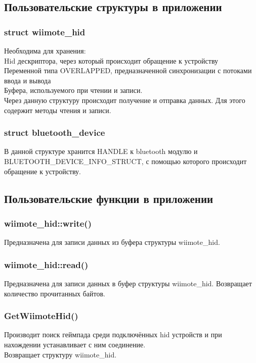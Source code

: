 \subsection{Пользовательские структуры в приложении}
\subsubsection{struct wiimote\_hid}
\quad Необходима для хранения:\\
\quad Hid дескриптора, через который происходит обращение к устройству\\
\quad Переменной типа OVERLAPPED, предназначенной синхронизации с потоками ввода и вывода\\
\quad Буфера, используемого при чтении и записи.\\
Через данную структуру происходит получение и отправка данных.
Для этого содержит методы чтения и записи.

\subsubsection{struct bluetooth\_device}
\quad В данной структуре хранится HANDLE к bluetooth модулю и BLUETOOTH\_DEVICE\_INFO\_STRUCT, с помощью которого происходит обращение к устройству.


\subsection{Пользовательские функции в приложении}
\subsubsection{wiimote\_hid::write()}
\quad Предназначена для записи данных из буфера структуры wiimote\_hid.

\subsubsection{wiimote\_hid::read()}
\quad Предназначена для записи данных в буфер структуры wiimote\_hid.
Возвращает количество прочитанных байтов.

\subsubsection{GetWiimoteHid()}
\quad Производит поиск геймпада среди подключённых hid устройств и при нахождении устанавливает с ним соединение.\\
\quad Возвращает структуру wiimote\_hid.

